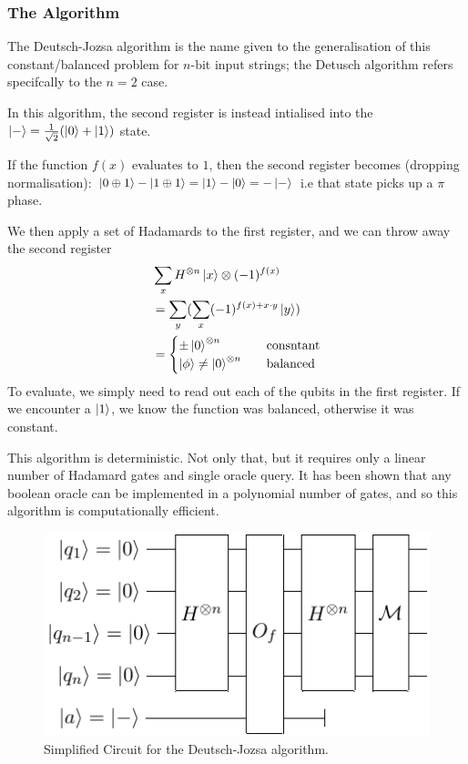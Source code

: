 \documentclass[11pt]{article}
\begin{document}
\subsubsection*{The Algorithm}
The Deutsch-Jozsa algorithm is the name given to the generalisation of this constant/balanced problem for $n$-bit input strings; the Detusch algorithm refers specifcally to the $n=2$ case.

In this algorithm, the second register is instead intialised into the $\ket{-} = \frac{1}{\sqrt{2}}(\ket{0} + \ket{1})$ state.

If the function $f(x)$ evaluates to $1$, then the second register becomes (dropping normalisation):
$\ket{0\oplus 1} - \ket{1\oplus 1} = \ket{1} - \ket{0} = -\ket{-}$
i.e that state picks up a $\pi$ phase.

We then apply a set of Hadamards to the first register, and we can throw away the second register
\begin{align}
    &\sum_{x} H^{\otimes n}\ket{x}\otimes (-1)^{f(x)}\\
    &= \sum_{y}(\sum_{x}(-1)^{f(x)+x\cdot y}\ket{y}) \\
    &= \begin{cases}
        \pm \ket{0}^{\otimes n} & \quad \text{consntant} \\
        \ket{\phi} \neq \ket{0}^{\otimes n} & \quad \text{balanced}
       \end{cases}
\end{align}
To evaluate, we simply need to read out each of the qubits in the first register. If we encounter a $\ket{1}$, we know the function was balanced, otherwise it was constant.

This algorithm is deterministic. Not only that, but it requires only a linear number of Hadamard gates and single oracle query. It has been shown that any boolean oracle can be implemented in a polynomial number of gates, and so this algorithm is computationally efficient.

\begin{figure}[h]
    \centering
    \includegraphics[width=.4\textwidth]{Circuits/dj.pdf}
    \caption{Simplified Circuit for the Deutsch-Jozsa algorithm.}
    \label{fig:djalgo}
\end{figure}
\end{document}
